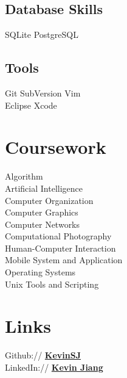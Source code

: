 \documentclass[]{deedy-resume-openfont}
\begin{document}
\begin{minipage}[t]{0.33\textwidth}
\subsection{Database Skills}
SQLite \textbullet{}PostgreSQL
\sectionsep

\subsection{Tools}
Git \textbullet{} SubVersion  \textbullet{} Vim \\
Eclipse \textbullet{} Xcode 
\sectionsep


\section{Coursework}
Algorithm			\\
Artificial Intelligence  \\
Computer Organization	\\
Computer Graphics	\\
Computer Networks	\\
Computational Photography \\
Human-Computer Interaction \\
Mobile System and Application \\
Operating Systems \\
Unix Tools and Scripting \\
\sectionsep


\section{Links} 
Github:// \href{https://github.com/kevinsj}{\bf KevinSJ} \\
LinkedIn://  \href{https://www.linkedin.com/in/kevsj}{\bf Kevin Jiang} \\
\sectionsep

%
%

\end{minipage} 
\hfill
\end{document}
